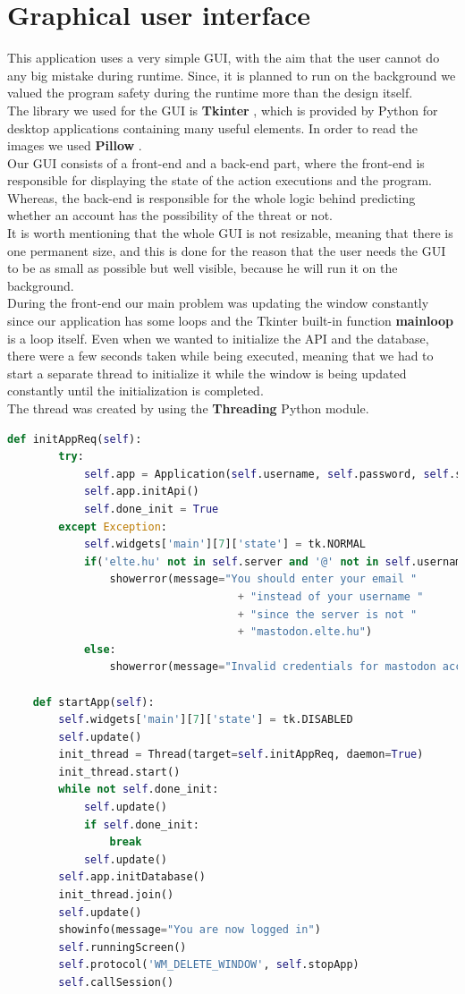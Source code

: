 \section{Graphical user interface}
This application uses a very simple GUI, with the aim that the user cannot do any big mistake during runtime.
Since, it is planned to run on the background we valued the program safety during the runtime more than the design
itself.
\\[5pt]
The library we used for the GUI is \textbf{Tkinter} \cite{tkinter}, which is provided by Python for desktop applications containing many
useful elements. In order to read the images we used \textbf{Pillow} \cite{pil}.
\\[5pt]
Our GUI consists of a front-end and a back-end part, where the front-end is responsible for displaying the state of the action
executions and the program. Whereas, the back-end is responsible for the whole logic behind predicting whether an account has
the possibility of the threat or not.
\\[5pt]
It is worth mentioning that the whole GUI is not resizable, meaning that there is one permanent size, and this is done for the reason
that the user needs the GUI to be as small as possible but well visible, because he will run it on the background.
\\[5pt]
During the front-end our main problem was updating the window constantly since our application has some loops and the Tkinter
built-in function \textbf{mainloop} is a loop itself. Even when we wanted to initialize the API and the database, there were a few
seconds taken while being executed, meaning that we had to start a separate thread to initialize it while the window is being updated constantly until the initialization is completed.
\\[5pt]
The thread was created by using the \textbf{Threading} \cite{thread} Python module.
\\[5pt]
\begin{lstlisting}[language=python, caption={Updating window while initializing the API and database}, captionpos=b]
	def initAppReq(self):
		try:
			self.app = Application(self.username, self.password, self.server)
			self.app.initApi()
			self.done_init = True
		except Exception:
			self.widgets['main'][7]['state'] = tk.NORMAL
			if('elte.hu' not in self.server and '@' not in self.username):
				showerror(message="You should enter your email "
									+ "instead of your username "
									+ "since the server is not "
									+ "mastodon.elte.hu")
			else:
				showerror(message="Invalid credentials for mastodon account")
	
	def startApp(self):
		self.widgets['main'][7]['state'] = tk.DISABLED
		self.update()
		init_thread = Thread(target=self.initAppReq, daemon=True)
		init_thread.start()
		while not self.done_init:
			self.update()
			if self.done_init:
				break
			self.update()
		self.app.initDatabase()
		init_thread.join()
		self.update()
		showinfo(message="You are now logged in")
		self.runningScreen()
		self.protocol('WM_DELETE_WINDOW', self.stopApp)
		self.callSession()
\end{lstlisting}
